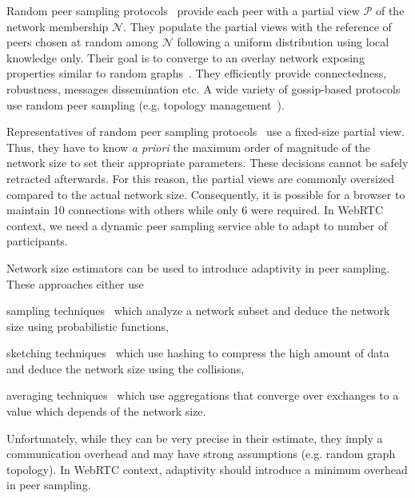 Random peer sampling protocols~\cite{jelasity2004peer} provide each
peer with a partial view $\mathcal{P}$ of the network membership
$\mathcal{N}$. They populate the partial views with the reference of
peers chosen at random among $\mathcal{N}$ following a uniform
distribution using local knowledge only. Their goal is to converge to
an overlay network exposing properties similar to random
graphs~\cite{erdos1959random}. They efficiently provide connectedness,
robustness, messages dissemination etc. A wide variety of gossip-based
protocols use random peer sampling (e.g. topology
management~\cite{voulgaris2005epidemic, jelasity2009tman,
  dabek2004vivaldi}).

Representatives of random peer sampling
protocols~\cite{voulgaris2005cyclon, eugster2003lightweight,
  tolgyeski2009adaptive} use a fixed-size partial view.  Thus, they
have to know \emph{a priori} the maximum order of magnitude of the
network size to set their appropriate parameters. These decisions
cannot be safely retracted afterwards. For this reason, the partial
views are commonly oversized compared to the actual network
size. Consequently, it is possible for a browser to maintain 10
connections with others while only 6 were required. In WebRTC context,
we need a dynamic peer sampling service able to adapt to number of
participants.

Network size estimators can be used to introduce adaptivity in peer
sampling. These approaches either use
\begin{inparaenum}[(i)]
\item sampling techniques~\cite{mane05network, ganesh2007peer,
    kostoulas2007active} which analyze a network subset and deduce the network
  size using probabilistic functions,
\item sketching techniques~\cite{flajolet2008hyperloglog, baquero2012extrema}
  which use hashing to compress the high amount of data and deduce the network
  size using the collisions,
\item averaging techniques~\cite{jelasity2004epidemic, blasa2011symmetric}
  which use aggregations that converge over exchanges to a value which depends
  of the network size.
\end{inparaenum}
Unfortunately, while they can be very precise in their estimate, they
imply a communication overhead and may have strong assumptions
(e.g. random graph topology). In WebRTC context, adaptivity should
introduce a minimum overhead in peer sampling.

